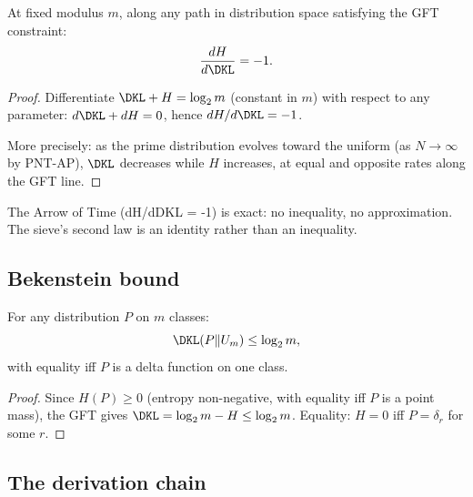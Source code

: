 \documentclass[12pt,a4paper]{article}
\begin{document}
\mID
\begin{idbox}
\label{id:arrow}
At fixed modulus $m$, along any path in distribution space satisfying
the GFT constraint:
\begin{equation}
  \frac{dH}{d\DKL} = -1.
  \label{eq:arrow}
\end{equation}

\begin{proof}
Differentiate $\DKL + H = \log_2 m$ (constant in $m$) with respect
to any parameter: $d\DKL + dH = 0$, hence $dH/d\DKL = -1$.

More precisely: as the prime distribution evolves toward the uniform
(as $N \to \infty$ by PNT-AP), $\DKL$ decreases while $H$ increases,
at equal and opposite rates along the GFT line.
\end{proof}
\end{idbox}

\begin{remark}
The Arrow of Time (dH/dDKL = -1) is exact: no inequality, no approximation.
The sieve's second law is an identity rather than an inequality.
\end{remark}

\subsection{Bekenstein bound}
\label{sec:bekenstein}

\mTHM
\begin{theorem}
\label{thm:bekenstein}
For any distribution $P$ on $m$ classes:
\begin{equation}
  \DKL(P\|U_m) \leq \log_2 m,
  \label{eq:bekenstein}
\end{equation}
with equality iff $P$ is a delta function on one class.

\begin{proof}
Since $H(P) \geq 0$ (entropy non-negative, with equality iff $P$ is
a point mass), the GFT gives $\DKL = \log_2 m - H \leq \log_2 m$.
Equality: $H = 0$ iff $P = \delta_r$ for some $r$.
\end{proof}
\end{theorem}

\subsection{The derivation chain}
\label{sec:ch4_chain}
\end{document}
